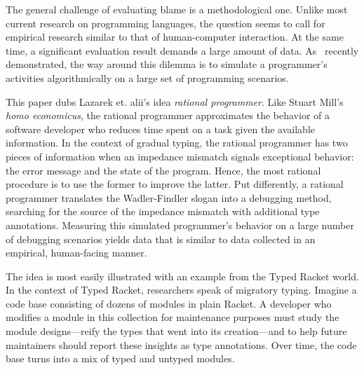 
The general challenge of evaluating blame is a methodological one. Unlike most
current research on programming languages, the question seems to call for
empirical research similar to that of human-computer interaction. At the same
time, a significant evaluation result demands a large amount of
data. As~\citet{lksfd-popl-2020} recently demonstrated, the way around this
dilemma is to simulate a programmer's activities algorithmically on a large set
of programming scenarios.



This paper dubs Lazarek et. alii's idea {\em rational programmer\/}. Like Stuart
Mill's {\it homo economicus\/}, the rational programmer approximates the
behavior of a software developer who reduces time spent on a task given the
available information. In the context of gradual typing, the rational programmer
has two pieces of information when an impedance mismatch signals exceptional
behavior: the error message and the state of the program. Hence, the most
rational procedure is to use the former to improve the latter. Put differently,
a rational programmer translates the Wadler-Findler slogan into a debugging
method, searching for the source of the impedance mismatch with additional type
annotations. Measuring this simulated programmer's behavior on a large number of
debugging scenarios yields data that is similar to data collected in an
empirical, human-facing manner.

The idea is most easily illustrated with an example from the Typed Racket
world. In the context of Typed Racket, researchers speak of migratory
typing. Imagine a code base consisting of dozens of modules in plain Racket.  A
developer who modifies a module in this collection for maintenance purposes must
study the module designs---reify the types that went into its creation---and to
help future maintainers should report these insights as type annotations. Over
time, the code base turns into a mix of typed and untyped modules.

